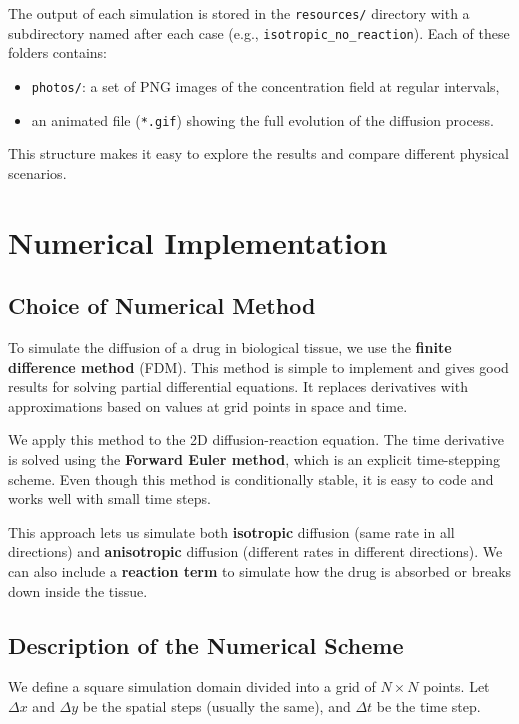 \documentclass[11pt, a4paper]{article}
\begin{document}
The output of each simulation is stored in the \texttt{resources/} directory with a subdirectory named after each case (e.g., \texttt{isotropic\_no\_reaction}). Each of these folders contains:
\begin{itemize}
  \item \texttt{photos/}: a set of PNG images of the concentration field at regular intervals,
  \item an animated file (\texttt{*.gif}) showing the full evolution of the diffusion process.
\end{itemize}

This structure makes it easy to explore the results and compare different physical scenarios.

\section{Numerical Implementation}

\subsection{Choice of Numerical Method}
To simulate the diffusion of a drug in biological tissue, we use the \textbf{finite difference method} (FDM). This method is simple to implement and gives good results for solving partial differential equations. It replaces derivatives with approximations based on values at grid points in space and time.

We apply this method to the 2D diffusion-reaction equation. The time derivative is solved using the \textbf{Forward Euler method}, which is an explicit time-stepping scheme. Even though this method is conditionally stable, it is easy to code and works well with small time steps.

This approach lets us simulate both \textbf{isotropic} diffusion (same rate in all directions) and \textbf{anisotropic} diffusion (different rates in different directions). We can also include a \textbf{reaction term} to simulate how the drug is absorbed or breaks down inside the tissue.

\subsection{Description of the Numerical Scheme}
We define a square simulation domain divided into a grid of \( N \times N \) points. Let \( \Delta x \) and \( \Delta y \) be the spatial steps (usually the same), and \( \Delta t \) be the time step.
\end{document}
